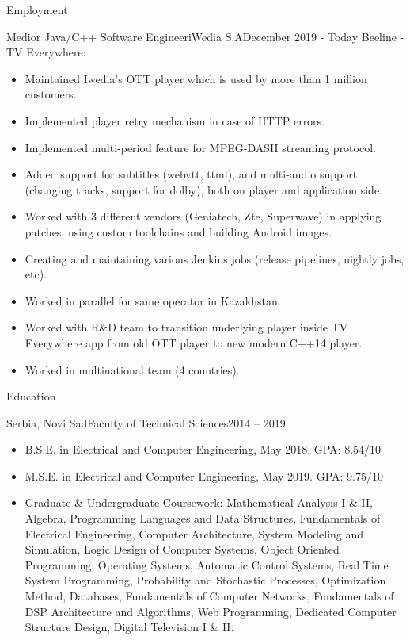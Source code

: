 \documentclass[]{mcdowellcv}
\begin{document}
\begin{cvsection}{Employment}
		\begin{cvsubsection}{Medior Java/C++ Software Engineer}{iWedia S.A}{December 2019 - Today}\vspace{\baselineskip}
			Beeline - TV Everywhere:
			\begin{itemize}
				\item Maintained Iwedia's OTT player which is used by more than 1 million customers.
				\item Implemented player retry mechanism in case of HTTP errors.  
				\item Implemented multi-period feature for MPEG-DASH streaming protocol.
				\item Added support for subtitles (webvtt, ttml), and multi-audio support (changing tracks, support for dolby), both on player and application side.
				\item Worked with 3 different vendors (Geniatech, Zte, Superwave) in applying patches, using custom toolchains and building Android images.
				\item Creating and maintaining various Jenkins jobs (release pipelines, nightly jobs, etc).
				\item Worked in parallel for same operator in Kazakhstan.
				\item Worked with R\&D team to transition underlying player inside TV Everywhere app from old OTT player to new modern C++14 player. 
				\item Worked in multinational team (4 countries).
			\end{itemize}
		\end{cvsubsection}
	\end{cvsection}

	\begin{cvsection}{Education}
		\begin{cvsubsection}{Serbia, Novi Sad}{Faculty of Technical Sciences}{2014 -- 2019}
			\begin{itemize}
				\item B.S.E. in Electrical and Computer Engineering, May 2018. GPA: 8.54/10
				\item M.S.E. in Electrical and Computer Engineering, May 2019. GPA: 9.75/10
				\item Graduate \& Undergraduate Coursework: Mathematical Analysis I \& II, Algebra, Programming Languages and Data Structures,
				Fundamentals of Electrical Engineering, Computer Architecture, System Modeling and Simulation, Logic Design of Computer Systems,
				Object Oriented Programming, Operating Systems, Automatic Control Systems, Real Time System Programming, Probability and Stochastic Processes,
				Optimization Method, Databases, Fundamentals of Computer Networks, Fundamentals of DSP Architecture and Algorithms,
				Web Programming, Dedicated Computer Structure Design, Digital Television I \& II.
			\end{itemize}
		\end{cvsubsection}
	\end{cvsection}
\end{document}

